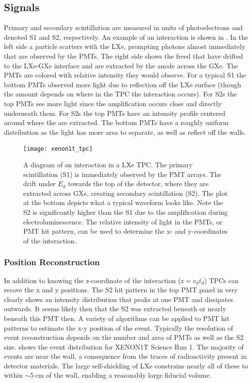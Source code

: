 \subsection{Signals}
\label{subsec:tpcs_signals}
Primary and secondary scintillation are measured in units of photoelectrons and denoted S1 and S2, respectively.  An example of an
interaction is shown in .  In the left side a particle scatters with the LXe, prompting photons almost
immediately that are observed by the PMTs.  The right side shows the freed \electron that have drifted to the LXe-GXe interface and
are extracted by the anode across the GXe.  The PMTs are colored with relative intensity they would observe.  For a typical S1 the
bottom PMTs observed more light due to reflection off the LXe surface (though the amount depends on where in the TPC the interaction
occurs).  For S2s the top PMTs see more light since the amplification occurs close and directly underneath them.  For S2s
the top PMTs have an intensity profile centered around where the \electron are extracted.  The bottom PMTs have a roughly uniform
distribution as the light has more area to separate, as well as reflect off the walls.

\begin{figure}
\centering
\texttt{[image: xenon1t\_tpc]}
\caption{A diagram of an interaction in a LXe TPC.  The primary scintillation (S1) is immediately
observed by the PMT arrays.  The \electron drift under $E_{d}$ towards the top of the detector, where they are extracted across GXe,
creating secondary scintillation (S2).  The plot at the bottom depicts what a typical waveform looks like.  Note the S2 is significantly
higher than the S1 due to the amplification during electroluminescence.  The relative intensity of light in the PMTs, or PMT hit
pattern, can be used to determine the x- and y-coordinates of the interaction.}
\label{fig:tpcs_signal_tpc}
\end{figure}



\subsubsection{Position Reconstruction}
\label{subsubsec:tpcs_signals_posrec}
In addition to knowing the z-coordinate of the interaction ($\mathrm{z} = v_{d} t_{d}$) TPCs can recove the x and y positions.  The S2
hit pattern in the top PMT panel in  very clearly shows an intensity distribution that peaks at one
PMT and dissipates outwards.  It seems likely then that the S2 was extracted beneath or nearly beneath this PMT then.  A variety of
algorithms can be applied to PMT hit patterns to estimate the x-y position of the event.  Typically the resolution of event
reconstruction depends on the number and area of PMTs as well as the S2 size.   shows the event
distribution for XENON1T Science Run 1.  The majority of events are near the wall, a consequence from the
traces of radioactivity present in detector materials.  The large self-shielding of LXe constrains nearly all of these to within
${\sim} 5\ \mathrm{cm}$ of the wall, enabling a reasonably large fiducial volume.


